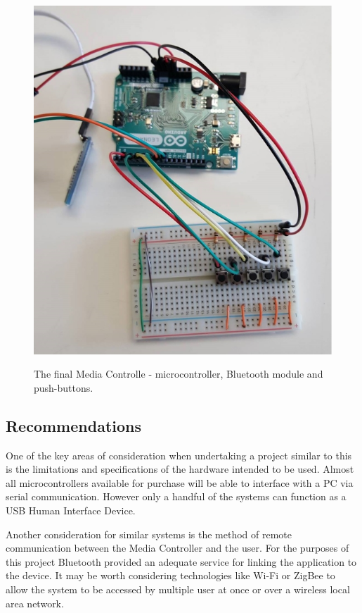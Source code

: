\documentclass{article}
\begin{document}
				\begin{figure}[h]
					\centering
					\label{fullSystem}
					{\includegraphics[scale = 0.5]{fullSystem}}
					\caption{The final Media Controlle - microcontroller, Bluetooth module and push-buttons.}
				\end{figure}
			
		\subsection{Recommendations}
			One of the key areas of consideration when undertaking a project similar to this is the  limitations and specifications of the hardware intended to be used. Almost all microcontrollers available for purchase will be able to interface with a PC via serial communication. However only a handful of the systems can function as a USB Human Interface Device.
			
			Another consideration for similar systems is the method of remote communication between the Media Controller and the user. For the purposes of this project Bluetooth provided an adequate service for linking the application to the device. It may be worth considering technologies like Wi-Fi or ZigBee to allow the system to be accessed by multiple user at once or over a wireless local area network. 
			
\end{document}
